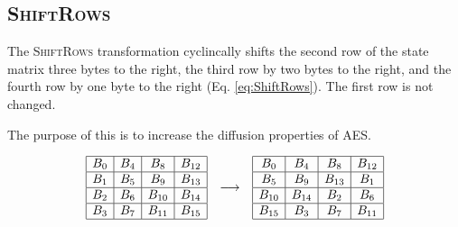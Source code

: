 \subsection{\textsc{ShiftRows}}
\label{sec:ShiftRows}

The \textsc{ShiftRows} transformation cyclincally shifts the second row of the state matrix three bytes to the right, the third row by two bytes to the right, and the fourth row by one byte to the right (Eq. \ref{eq:ShiftRows}).
The first row is not changed.

The purpose of this is to increase the diffusion properties of AES.

\begin{equation}
    \begin{array}{c@{\quad \longrightarrow \quad}c}
        \begin{array}{|c|c|c|c|}
        \hline
        B_0 & B_4 & B_8 & B_{12} \\
        \hline
        B_1 & B_5 & B_9 & B_{13} \\
        \hline
        B_2 & B_6 & B_{10} & B_{14} \\
        \hline
        B_3 & B_7 & B_{11} & B_{15} \\
        \hline
        \end{array}
    &
    \begin{array}{|c|c|c|c|}
        \hline
        B_0 & B_4 & B_8 & B_{12} \\
        \hline
        B_5 & B_9 & B_{13} & B_1 \\
        \hline
        B_{10} & B_{14} & B_2 & B_6 \\
        \hline
        B_{15} & B_3 & B_7 & B_{11} \\
        \hline
        \end{array}
    \end{array}
    \label{eq:ShiftRows}
\end{equation}